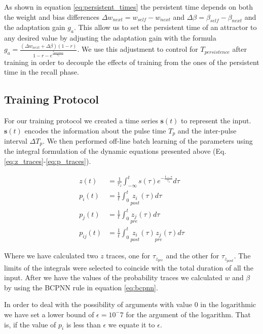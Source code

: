 \documentclass[10pt,a4paper]{article}
\begin{document}
As shown in equation \ref{eq:persistent_times} the persistent time depends on both the weight and bias differences $\Delta w_{next} = w_{self} - w_{next}$ and $\Delta \beta = \beta_{self} - \beta_{next}$ and the adaptation gain $g_a$. This allow us to  set the persistent time of an attractor to any desired value by adjusting the adaptation gain with the formula $g_a = \frac{(\Delta w_{next} + \Delta \beta)(1 - r)}{1 - r - e^{\frac{T_{persistence}}{\tau_a}}}$. We use this adjustment to control for $T_{persistence}$ after training in order to decouple the effects of training from the ones of the persistent time in the recall phase. 

\subsection{Training Protocol}
For our training protocol we created a time series  $\mathbf{s}(t)$ to represent the input. $\mathbf{s}(t)$  encodes the information about the pulse time $T_p$ and the inter-pulse interval $\Delta T_p$. We then performed off-line batch learning of the parameters using the integral formulation of the dynamic equations presented above (Eq. \ref{eq:z_traces}-\ref{eq:p_traces}).

\begin{align}
z(t) &= \frac{1}{\tau_z } \int_{-\infty}^{t} s(\tau) e^{-\frac{t - \tau}{\tau_z}} d\tau \label{eq:flitering}  \\
p_i(t) &= \frac{1}{t}\int_0^{t} \underset{post}{z_i}(\tau) d\tau  \label{eq:bcpnn_off_line_prob_post} \\
p_j(t) &= \frac{1}{t}\int_0^{t} \underset{pre}{z_j}(\tau) d\tau  \label{eq:bcpnn_off_line_prob_pre} \\
p_{ij}(t) &= \frac{1}{t}\int_0^{t} \underset{post}{z_i}(\tau) 
\underset{pre}{z_j}(\tau) d\tau \label{eq:bcpnn_off_line_joint} 
\end{align}

Where we have calculated two $z$ traces, one for $\tau_{z_{pre}}$ and the other for $\tau_{z_{post}}$. The limits of the integrals were selected to coincide with the total duration of all the input. After we have the values of the probability traces we calculated $w$ and $\beta$ by using the BCPNN rule in equation \ref{eq:bcpnn}.

In order to deal with the possibility of arguments with value 0 in the logarithmic we have set a lower bound of $\epsilon = 10^-7$ for the argument of the logarithm. That is, if the value of $p_i$ is less than $\epsilon$ we equate it to $\epsilon$. 
\end{document}
